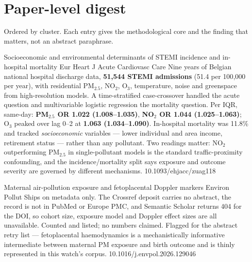 \documentclass[10pt]{article}
\begin{document}
\clearpage

\section*{\sffamily\bfseries\color{Deep}Paper-level digest}
\vspace{-1.5mm}{\color{Amber}\rule{\linewidth}{1.1pt}}\vspace{1mm}

{\fontsize{7.4}{9}\selectfont\color{Slate}Ordered by cluster. Each entry gives the
methodological core and the finding that matters, not an abstract paraphrase.\par}


{Socioeconomic and environmental determinants of STEMI incidence and in-hospital mortality}
{Eur Heart J Acute Cardiovasc Care}
{Nine years of Belgian national hospital discharge data, \textbf{51{,}544 STEMI
admissions} (51.4 per 100{,}000 per year), with residential PM$_{2.5}$, NO$_2$, O$_3$,
temperature, noise and greenspace from high-resolution models. A time-stratified
case-crossover handled the acute question and multivariable logistic regression the
mortality question. Per IQR, same-day: \textbf{PM$_{2.5}$ OR 1.022 (1.008--1.035)},
\textbf{NO$_2$ OR 1.044 (1.025--1.063)}; O$_3$ peaked over lag 0--2 at
\textbf{1.063 (1.034--1.090)}. In-hospital mortality was 11.8\% and tracked
\emph{socioeconomic} variables --- lower individual and area income, retirement status ---
rather than any pollutant. Two readings matter: NO$_2$ outperforming PM$_{2.5}$ in
single-pollutant models is the standard traffic-proximity confounding, and the
incidence/mortality split says exposure and outcome severity are governed by different
mechanisms.}
{10.1093/ehjacc/zuag118}


{Maternal air-pollution exposure and fetoplacental Doppler markers}
{Environ Pollut}
{Ships on metadata only. The Crossref deposit carries no abstract, the record is not in
PubMed or Europe PMC, and Semantic Scholar returns 404 for the DOI, so cohort size,
exposure model and Doppler effect sizes are all unavailable. Counted and listed; no
numbers claimed. Flagged for the abstract retry list --- fetoplacental haemodynamics is a
mechanistically informative intermediate between maternal PM exposure and birth outcome
and is thinly represented in this watch's corpus.}
{10.1016/j.envpol.2026.129046}
\end{document}
